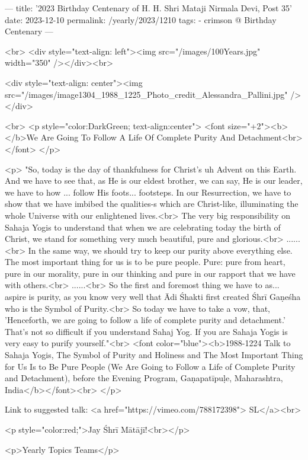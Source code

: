 ---
title: '2023 Birthday Centenary of H. H. Shri Mataji Nirmala Devi, Post 35'
date: 2023-12-10
permalink: /yearly/2023/1210
tags:
  - crimson @ Birthday Centenary
---

<br>
<div style="text-align: left"><img src="/images/100Years.jpg" width="350" /></div><br>

<div style="text-align: center"><img src="/images/image1304_1988_1225_Photo_credit_Alessandra_Pallini.jpg" /></div>

<br>
<p style="color:DarkGreen; text-align:center">
<font size="+2"><b></b>We Are Going To Follow A Life Of Complete Purity And Detachment<br></font>
</p>

<p>
"So, today is the day of thankfulness for Christ's uh Advent on this Earth. And we have to see that, as He is our eldest brother, we can say, He is our leader, we have to how ... follow His foots... footsteps. In our Resurrection, we have to show that we have imbibed the qualities-s which are Christ-like, illuminating the whole Universe with our enlightened lives.<br>
The very big responsibility on Sahaja Yogis to understand that when we are celebrating today the birth of Christ, we stand for something very much beautiful, pure and glorious.<br>
......<br>
In the same way, we should try to keep our purity above everything else. The most important thing for us is to be pure people. Pure: pure from heart, pure in our morality, pure in our thinking and pure in our rapport that we have with others.<br>
......<br>
So the first and foremost thing we have to as... aspire is purity, as you know very well that Ādi Śhakti first created Śhrī Gaṇeśha who is the Symbol of Purity.<br>
So today we have to take a vow, that, 'Henceforth, we are going to follow a life of complete purity and detachment.' That's not so difficult if you understand Sahaj Yog. If you are Sahaja Yogis is very easy to purify yourself."<br>
<font color="blue"><b>1988-1224 Talk to Sahaja Yogis, The Symbol of Purity and Holiness and The Most Important Thing for Us Is to Be Pure People (We Are Going to Follow a Life of Complete Purity and Detachment), before the Evening Program, Gaṇapatīpuḷe, Maharashtra, India</b></font><br>
</p>

Link to suggested talk: <a href="https://vimeo.com/788172398"> SL</a><br>

<p style="color:red;">Jay Śhrī Mātājī!<br></p>

<p>Yearly Topics Teams</p>